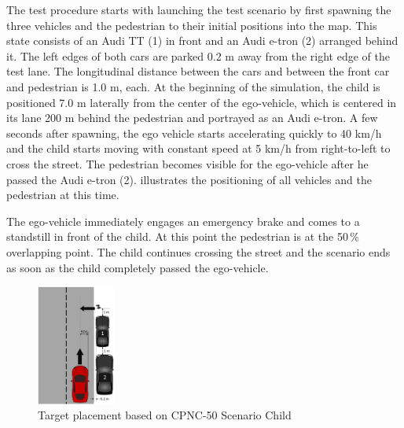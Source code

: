 The test procedure starts with launching the test scenario by first spawning the three vehicles and the pedestrian to their initial positions into the map. This state consists of an Audi TT (1) in front and an Audi e-tron (2) arranged behind it. The left edges of both cars are parked 0.2 m away from the right edge of the test lane. The longitudinal distance between the cars and between the front car and pedestrian is 1.0 m, each. At the beginning of the simulation, the child is positioned 7.0 m laterally from the center of the ego-vehicle, which is centered in its lane 200 m behind the pedestrian and portrayed as an Audi e-tron. A few seconds after spawning, the ego vehicle starts accelerating quickly to 40 km/h and the child starts moving with constant speed at 5 km/h from right-to-left to cross the street. The pedestrian becomes visible for the ego-vehicle after he passed the Audi e-tron (2).  illustrates the positioning of all vehicles and the pedestrian at this time.

The ego-vehicle immediately engages an emergency brake and comes to a standstill in front of the child. At this point the pedestrian is at the 50\,\% overlapping point. The child continues crossing the street and the scenario ends as soon as the child completely passed the ego-vehicle.
\begin{figure}[b]
	\centering
	\includegraphics[width=0.23\textwidth]{images/Target_Placement_test_scenario.png}
	\caption{Target placement based on CPNC-50 Scenario Child \cite{Protocoll}}
	\label{fig:coordination}
\end{figure}

